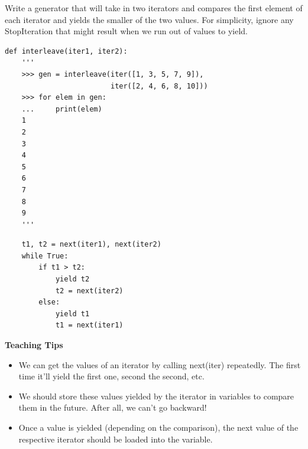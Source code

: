 \begin{blocksection}
\question Write a generator that will take in two iterators and compares the
first element of each iterator and yields the smaller of the two values.
For simplicity, ignore any StopIteration that might result when we run out of
values to yield.

\begin{lstlisting}
def interleave(iter1, iter2):
    '''
    >>> gen = interleave(iter([1, 3, 5, 7, 9]),
                         iter([2, 4, 6, 8, 10]))
    >>> for elem in gen:
    ...     print(elem)
    1
    2
    3
    4
    5
    6
    7
    8
    9
    '''
\end{lstlisting}

\begin{solution}[1in]
\begin{lstlisting}
    t1, t2 = next(iter1), next(iter2)
    while True:
        if t1 > t2:
            yield t2
            t2 = next(iter2)
        else:
            yield t1
            t1 = next(iter1)
\end{lstlisting}
\end{solution}
\end{blocksection}

\begin{guide}
\begin{blocksection}
    \textbf{Teaching Tips}
    \begin{itemize}
    \item We can get the values of an iterator by calling next(iter) repeatedly. The first time it'll yield the first one, second the second, etc.
    \item We should store these values yielded by the iterator in variables to compare them in the future. After all, we can't go backward!
    \item Once a value is yielded (depending on the comparison), the next value of the respective iterator should be loaded into the variable.
    \end{itemize}
\end{blocksection}
\end{guide}
